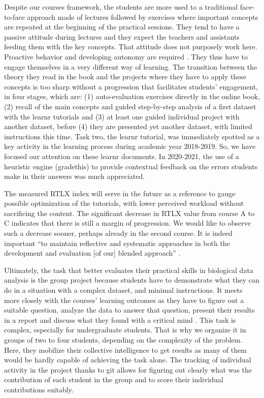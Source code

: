 \documentclass{aims}
\theoremstyle{definition}
\begin{document}
Despite our courses framework, the students are more used to a
traditional face-to-face approach made of lectures followed by exercises
where important concepts are repeated at the beginning of the practical
sessions. They tend to have a passive attitude during lectures and they
expect the teachers and assistants feeding them with the key concepts.
That attitude does not purposely work here. Proactive behavior and
developing autonomy are required \cite{Freeman2014}. They thus have to
engage themselves in a very different way of learning. The transition
between the theory they read in the book and the projects where they
have to apply these concepts is too sharp without a progression that
facilitates students' engagement, in four stages, which are: (1)
auto-evaluation exercises directly in the online book, (2) recall of the
main concepts and guided step-by-step analysis of a first dataset with
the learnr tutorials and (3) at least one guided individual project with
another dataset, before (4) they are presented yet another dataset, with
limited instructions this time. Task two, the learnr tutorial, was
immediately spotted as a key activity in the learning process during
academic year 2018-2019. So, we have focused our attention on these
learnr documents. In 2020-2021, the use of a heuristic engine
(gradethis) to provide contextual feedback on the errors students make
in their answers was much appreciated.

The measured RTLX index will serve in the future as a reference to gauge
possible optimization of the tutorials, with lower perceived workload
without sacrificing the content. The significant decrease in RTLX value
from course A to C indicates that there is still a margin of
progression. We would like to observe such a decrease sooner, perhaps
already in the second course. It is indeed important ``to maintain
reflective and systematic approaches in both the development and
evaluation {[}of our{]} blended approach'' \cite{Spadafora2018}.

Ultimately, the task that better evaluates their practical skills in
biological data analysis is the group project because students have to
demonstrate what they can do in a situation with a complex dataset, and
minimal instructions. It meets more closely with the courses' learning
outcomes as they have to figure out a suitable question, analyze the
data to answer that question, present their results in a report and
discuss what they found with a critical mind \cite{Auker2020}. This task
is complex, especially for undergraduate students. That is why we
organize it in groups of two to four students, depending on the
complexity of the problem. Here, they mobilize their collective
intelligence to get results as many of them would be hardly capable of
achieving the task alone. The tracking of individual activity in the
project thanks to git allows for figuring out clearly what was the
contribution of each student in the group and to score their individual
contributions suitably.
\end{document}
